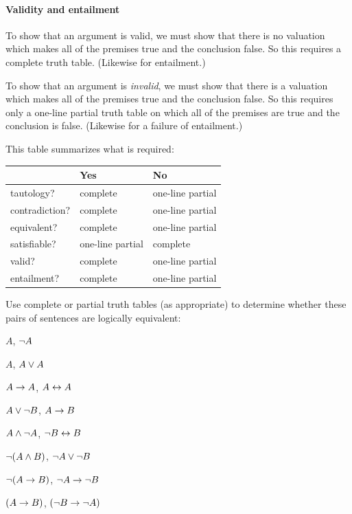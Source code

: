 \paragraph{Validity and entailment}
To show that an argument is valid, we must show that there is no valuation which makes all of the premises true and the conclusion false. So this  requires a complete truth table.  (Likewise for entailment.)

To show that an argument is \emph{invalid}, we must show that there is a valuation which makes all of the premises true and the conclusion false. So this requires only a one-line partial truth table on which all of the premises are true and the conclusion is false. (Likewise for a failure of entailment.)

This table summarizes what is required:

\begin{center}
\begin{tabular}{l l l}
 & \textbf{Yes} & \textbf{No}\\
 \hline
tautology? & complete & one-line partial \\
contradiction? &  complete & one-line partial \\
equivalent? & complete  & one-line partial \\
satisfiable? & one-line partial & complete \\
valid? & complete & one-line partial \\
entailment? & complete & one-line partial\\
\end{tabular}
\end{center}
\label{table.CompleteVsPartial}


\practiceproblems

\problempart
\label{pr.TT.equiv3}
Use complete or partial truth tables (as appropriate) to determine whether these pairs of sentences are logically equivalent:
\begin{compactlist}
\item $A$, $\neg A$ %
\item $A$, $A \vee A$ %
\item $A\rightarrow A$, $A \leftrightarrow A$ %
\item $A \vee \neg B$, $A\rightarrow B$ %
\item $A \wedge \neg A$, $\neg B \leftrightarrow B$ %
\item $\neg(A \wedge B)$, $\neg A \vee \neg B$ %
\item $\neg(A \rightarrow B)$, $\neg A \rightarrow \neg B$ %
\item $(A \rightarrow B)$, $(\neg B \rightarrow \neg A)$ %
\end{compactlist}

